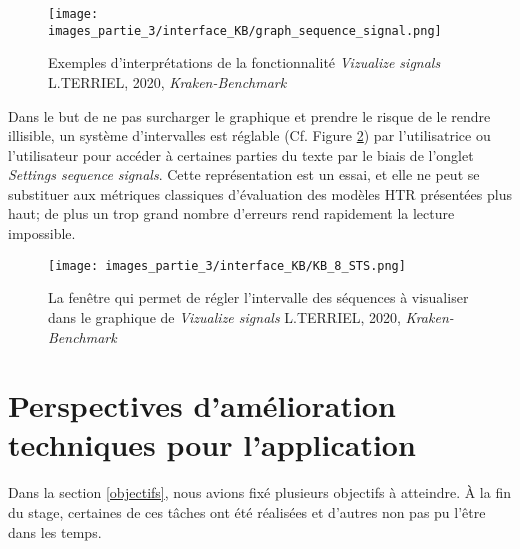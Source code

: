 \begin{figure}[h!]
    \centering
    \texttt{[image: images\_partie\_3/interface\_KB/graph\_sequence\_signal.png]}
        \caption{Exemples d'interprétations de la fonctionnalité  \textit{Vizualize signals} \textcopyright L.TERRIEL, 2020, \textit{Kraken-Benchmark}}
        \label{fig:accueil_KB_7}
\end{figure}

Dans le but de ne pas surcharger le graphique et prendre le risque de le rendre illisible, un système d'intervalles est réglable (Cf. Figure \ref{fig:accueil_KB_6}) par l'utilisatrice ou l'utilisateur pour accéder à certaines parties du texte par le biais de l'onglet \textit{Settings sequence signals}. Cette représentation est un essai, et elle ne peut se substituer aux métriques classiques d'évaluation des modèles HTR présentées plus haut; de plus un trop grand nombre d'erreurs rend rapidement la lecture impossible.

\begin{figure}[h!]
    \centering
    \texttt{[image: images\_partie\_3/interface\_KB/KB\_8\_STS.png]}
        \caption{La fenêtre  qui permet de régler l'intervalle des séquences à visualiser dans le graphique de \textit{Vizualize signals} \textcopyright L.TERRIEL, 2020, \textit{Kraken-Benchmark}}
        \label{fig:accueil_KB_6}
\end{figure}

\newpage
\section{Perspectives d'amélioration techniques pour l'application}\label{perspectives_amélios}

Dans la section \ref{objectifs}, nous avions fixé plusieurs objectifs à atteindre. À la fin du stage, certaines de ces tâches ont été réalisées et d'autres non pas pu l'être dans les temps. 

